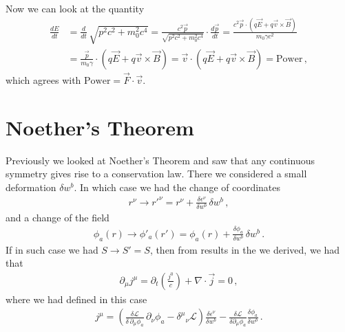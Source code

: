 \documentclass[11pt, onesided]{book}
\theoremstyle{break}
\theoremstyle{break}
\newcommand{\pd}{\partial}
\begin{document}
Now we can look at the quantity
\begin{align*}
\frac{dE}{dt} &= \frac{d}{dt}\, \sqrt{p^2 c^2  + m_0^2 c^4} = \frac{c^2 \vec{p}}{\sqrt{p^2 c^2 + m_0^2 c^4}}\cdot \frac{d\vec{p}}{dt} = \frac{c^2 \vec{p}\cdot (q\vec{E} + q\vec{v}\times \vec{B})}{m_0 \gamma c^2} \\
&= \frac{\vec{p}}{m_0 \gamma}\cdot (q\vec{E} + q\vec{v}\times \vec{B}) 
= \vec{v}\cdot (q\vec{E} + q\vec{v}\times \vec{B}) = \text{Power}\,,
\end{align*}
which agrees with $\text{Power} = \vec{F}\cdot \vec{v}$. 

\section{Noether's Theorem}
Previously we looked at Noether's Theorem and saw that any continuous symmetry gives rise to a conservation law. There we considered a small deformation $\delta w^b$. In which case we had the change of coordinates
\begin{align*}
r^\nu \to r'^\nu =r^\nu + \frac{\delta \epsilon^\nu}{\delta w^b}\, \delta w^b\,,
\end{align*}
and a change of the field
\begin{align*}
\phi_a(r) \to \phi'_a(r') = \phi_a(r) + \frac{\delta \phi_a}{\delta w^b}\, \delta w^b\,.
\end{align*}
If in such case we had $S \to S' = S$, then from results in the we derived, we had that
\begin{align*}
\pd_\mu j^\mu = \pd_t \left( \frac{j^0}{c}\right) + \nabla \cdot \vec{j} = 0\,,
\end{align*}
where we had defined in this case
\begin{align}
j^\mu = \left( \frac{\delta \mathcal{L}}{\delta\, \pd_\mu \phi_a} \, \pd_\nu \phi_a - \delta^\mu{}_\nu \mathcal{L}\right) \frac{\delta \epsilon^\nu}{\delta w^b} - \frac{\delta \mathcal{L}}{\delta \pd_\mu \phi_a}\frac{\delta \phi_a}{\delta w^b}\,.
\end{align}
\end{document}
